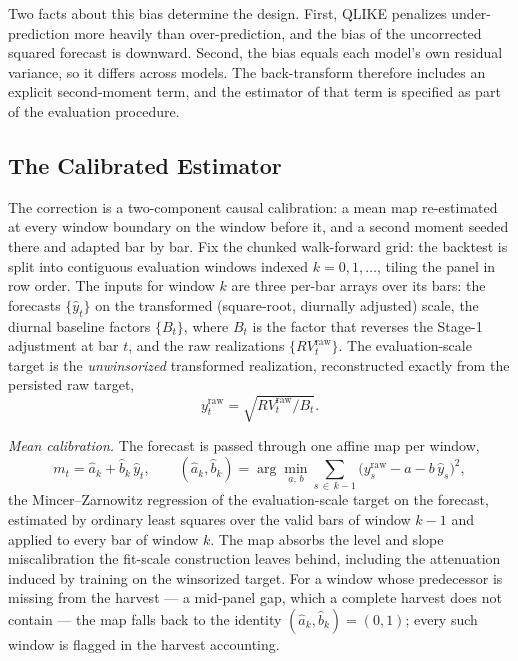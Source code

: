 Two facts about this bias determine the design. First, QLIKE penalizes
under-prediction more heavily than over-prediction, and the bias of the
uncorrected squared forecast is downward. Second, the bias equals each
model's own residual variance, so it differs across models. The
back-transform therefore includes an explicit second-moment term, and the
estimator of that term is specified as part of the evaluation procedure.

\subsection{The Calibrated Estimator}
\label{sec:smearing_estimator}

The correction is a two-component causal calibration: a mean map
re-estimated at every window boundary on the window before it, and a
second moment seeded there and adapted bar by bar. Fix the chunked
walk-forward grid: the backtest is split into contiguous evaluation
windows indexed $k = 0, 1, \dots$, tiling the panel in row order. The
inputs for window $k$ are three per-bar arrays over its bars: the
forecasts $\{\hat{y}_t\}$ on the transformed (square-root, diurnally
adjusted) scale, the diurnal baseline factors $\{B_t\}$, where $B_t$ is
the factor that reverses the Stage-1 adjustment at bar $t$, and the raw
realizations $\{RV^{\mathrm{raw}}_t\}$. The evaluation-scale target is the
\emph{unwinsorized} transformed realization, reconstructed exactly from
the persisted raw target,
\begin{equation}
    y^{\mathrm{raw}}_t = \sqrt{RV^{\mathrm{raw}}_t / B_t}.
    \label{eq:yraw}
\end{equation}

\emph{Mean calibration.} The forecast is passed through one affine map per
window,
\begin{equation}
    m_t = \hat{a}_k + \hat{b}_k\, \hat{y}_t,
    \qquad
    (\hat{a}_k, \hat{b}_k)
    = \arg\min_{a,\, b} \sum_{s \,\in\, k-1}
      \bigl(y^{\mathrm{raw}}_s - a - b\,\hat{y}_s\bigr)^2,
    \label{eq:mean_calib}
\end{equation}
the Mincer--Zarnowitz regression of the evaluation-scale target on the
forecast, estimated by ordinary least squares over the valid bars of
window $k-1$ and applied to every bar of window $k$. The map absorbs the
level and slope miscalibration the fit-scale construction leaves behind,
including the attenuation induced by training on the winsorized target.
For a window whose predecessor is missing from the harvest --- a
mid-panel gap, which a complete harvest does not contain --- the map
falls back to the identity $(\hat{a}_k, \hat{b}_k) = (0, 1)$; every such
window is flagged in the harvest accounting.


